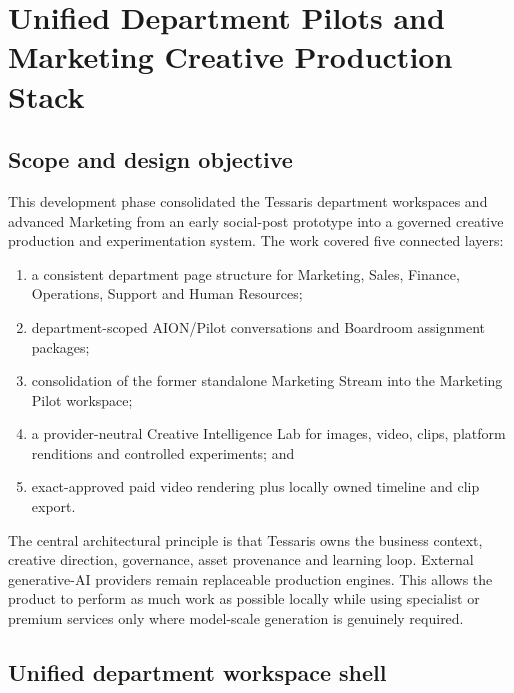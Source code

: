 % 

\section{Unified Department Pilots and Marketing Creative Production Stack}
\label{sec:tessaris-department-pilots-marketing-creative}

\subsection{Scope and design objective}

This development phase consolidated the Tessaris department workspaces and
advanced Marketing from an early social-post prototype into a governed creative
production and experimentation system. The work covered five connected layers:

\begin{enumerate}
    \item a consistent department page structure for Marketing, Sales, Finance,
    Operations, Support and Human Resources;
    \item department-scoped AION/Pilot conversations and Boardroom assignment
    packages;
    \item consolidation of the former standalone Marketing Stream into the
    Marketing Pilot workspace;
    \item a provider-neutral Creative Intelligence Lab for images, video, clips,
    platform renditions and controlled experiments; and
    \item exact-approved paid video rendering plus locally owned timeline and
    clip export.
\end{enumerate}

The central architectural principle is that Tessaris owns the business context,
creative direction, governance, asset provenance and learning loop. External
generative-AI providers remain replaceable production engines. This allows the
product to perform as much work as possible locally while using specialist or
premium services only where model-scale generation is genuinely required.

\subsection{Unified department workspace shell}

